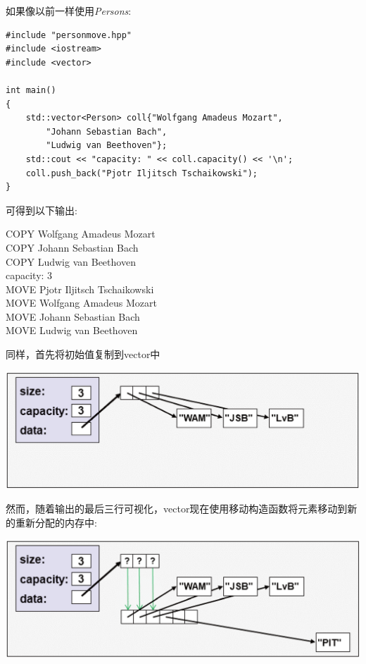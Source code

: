 如果像以前一样使用\textit{Persons}:\par

{\color{red}{basics/personmove.cpp}}\par

\begin{lstlisting}[caption={}]
#include "personmove.hpp"
#include <iostream>
#include <vector>

int main()
{
	std::vector<Person> coll{"Wolfgang Amadeus Mozart",
		"Johann Sebastian Bach",
		"Ludwig van Beethoven"};
	std::cout << "capacity: " << coll.capacity() << '\n';
	coll.push_back("Pjotr Iljitsch Tschaikowski");
}
\end{lstlisting}

可得到以下输出:\par

\begin{tcolorbox}[colback=white,colframe=black]
COPY Wolfgang Amadeus Mozart \\ 
COPY Johann Sebastian Bach \\
COPY Ludwig van Beethoven \\
capacity: 3 \\
MOVE Pjotr Iljitsch Tschaikowski \\
MOVE Wolfgang Amadeus Mozart \\
MOVE Johann Sebastian Bach \\
MOVE Ludwig van Beethoven
\end{tcolorbox}

同样，首先将初始值复制到vector中\par

\begin{center}
	\includegraphics[width=1.0\textwidth]{content/1/chapter7/images/4}
\end{center}

然而，随着输出的最后三行可视化，vector现在使用移动构造函数将元素移动到新的重新分配的内存中:\par

\begin{center}
	\includegraphics[width=1.0\textwidth]{content/1/chapter7/images/5}
\end{center}

